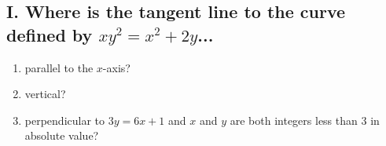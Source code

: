 \documentclass{article}
\begin{document}
\subsection*{I. Where is the tangent line to the curve defined by $xy^{2}=x^{2}+2y$...}

\begin{enumerate}
\item parallel to the $x$-axis?
\item vertical?
\item perpendicular to $3y=6x+1$ and $x$ and $y$ are both integers less than 3 in absolute value?
\end{enumerate}







\end{document}
